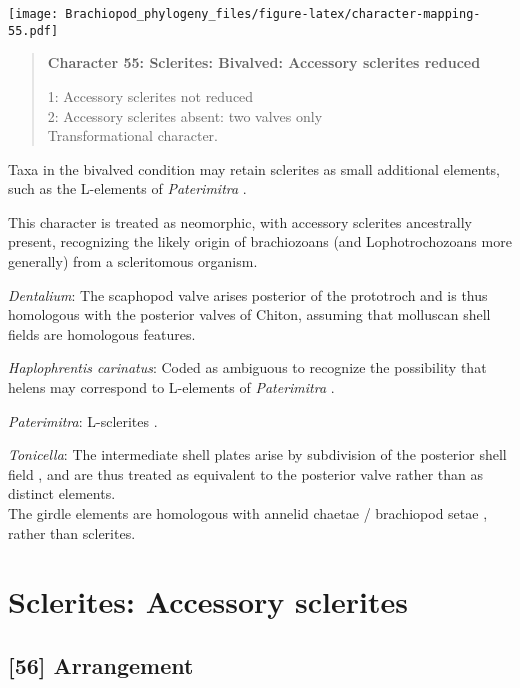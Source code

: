 \documentclass[openany]{book}
\theoremstyle{definition}
\theoremstyle{definition}
\theoremstyle{definition}
\theoremstyle{remark}
\begin{document}
\texttt{[image: Brachiopod\_phylogeny\_files/figure-latex/character-mapping-55.pdf]}

\begin{quote}
\textbf{Character 55: Sclerites: Bivalved: Accessory sclerites reduced}

1: Accessory sclerites not reduced\\
2: Accessory sclerites absent: two valves only\\
Transformational character.
\end{quote}

Taxa in the bivalved condition may retain sclerites as small additional
elements, such as the L-elements of \emph{Paterimitra}
\citep{Skovsted2015Theearly}.

This character is treated as neomorphic, with accessory sclerites
ancestrally present, recognizing the likely origin of brachiozoans (and
Lophotrochozoans more generally) from a scleritomous organism.

\hypertarget{Dentalium-coding-55}{}
\emph{Dentalium}: The scaphopod valve arises posterior of the prototroch
and is thus homologous with the posterior valves of Chiton, assuming
that molluscan shell fields are homologous features.

\hypertarget{Haplophrentis_carinatus-coding-55}{}
\emph{Haplophrentis carinatus}: Coded as ambiguous to recognize the
possibility that helens may correspond to L-elements of
\emph{Paterimitra} \citep{Moysiuk2017Hyolithsare}.

\hypertarget{Paterimitra-coding-55}{}
\emph{Paterimitra}: L-sclerites \citep{Skovsted2009Thescleritome}.

\hypertarget{Tonicella-coding-55}{}
\emph{Tonicella}: The intermediate shell plates arise by subdivision of
the posterior shell field \citep{Wanninger2002C}, and are thus treated
as equivalent to the posterior valve rather than as distinct elements.\\
The girdle elements are homologous with annelid chaetae / brachiopod
setae \citep{Leise1982}, rather than sclerites.

\section{Sclerites: Accessory
sclerites}\label{sclerites-accessory-sclerites}

\subsection*{{[}56{]} Arrangement}\label{arrangement}
\end{document}

